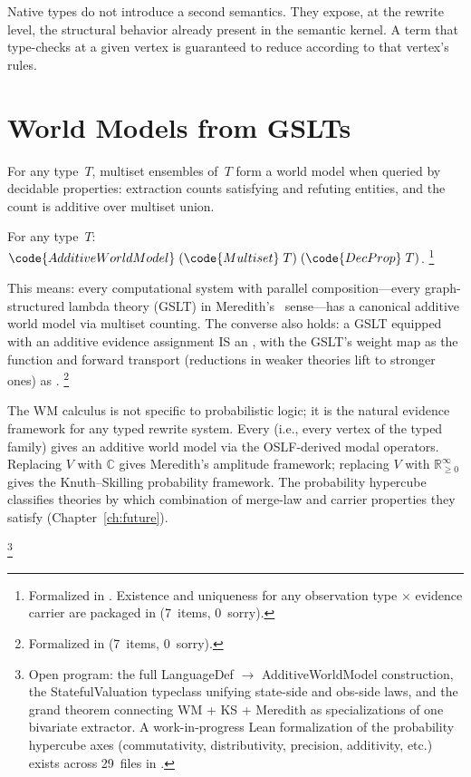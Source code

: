 \documentclass[11pt,openany]{report}
\begin{document}
Native types do not introduce a second semantics.  They expose, at
the rewrite level, the structural behavior already present in the
semantic kernel.  A term that type-checks at a given vertex is
guaranteed to reduce according to that vertex's rules.


\section{World Models from GSLTs}
\label{sec:gslt-wm}
\label{sec:gslt-open-program}

For any type~$T$, multiset ensembles of~$T$ form a world model when
queried by decidable properties: extraction counts satisfying and
refuting entities, and the count is additive over multiset union.

\begin{theorem}
For any type~$T$:
$\code{AdditiveWorldModel}\;(\code{Multiset}\;T)\;(\code{DecProp}\;T)$.%
\footnote{Formalized in
.
Existence and uniqueness for any observation type $\times$
evidence carrier are packaged in
(7~items, 0~sorry).}
\end{theorem}

\noindent
This means: every computational system with parallel
composition---every graph-structured lambda theory (GSLT) in
Meredith's~\cite{meredith2026ccc} sense---has a canonical additive
world model via multiset counting.  The converse also holds: a
GSLT equipped with an additive evidence assignment IS an
, with the GSLT's weight map as the
 function and forward transport (reductions in
weaker theories lift to stronger ones) as .%
\footnote{Formalized in
(7~items, 0~sorry).}

\begin{conjecture}
The WM calculus is not specific to probabilistic logic; it is the
natural evidence framework for any typed rewrite system.  Every
 (i.e., every vertex
of the typed family) gives an additive world model via the
OSLF-derived modal operators.  Replacing $V$ with $\mathbb{C}$ gives
Meredith's amplitude framework; replacing $V$ with
$\mathbb{R}_{\ge 0}^\infty$ gives the Knuth--Skilling probability
framework.  The probability
hypercube~\cite{StayWells2026} classifies theories by which
combination of merge-law and carrier properties they satisfy
(Chapter~\ref{ch:future}).
\end{conjecture}
%
\footnote{Open program: the full LanguageDef $\to$ AdditiveWorldModel
construction, the StatefulValuation typeclass unifying state-side and
obs-side laws, and the grand theorem connecting WM + KS + Meredith as
specializations of one bivariate extractor.  A work-in-progress Lean formalization
of the probability hypercube axes (commutativity, distributivity,
precision, additivity, etc.) exists across 29~files in
.}
\end{document}

